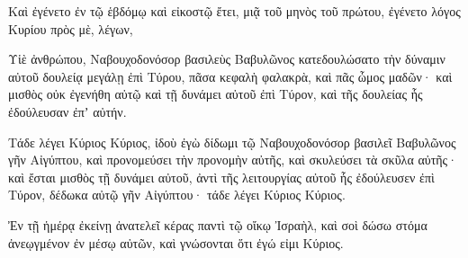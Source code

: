 {\par }{\PP {}Καὶ ἐγένετο ἐν τῷ ἑβδόμῳ καὶ εἰκοστῷ ἔτει, μιᾷ τοῦ μηνὸς τοῦ πρώτου, ἐγένετο λόγος Κυρίου πρὸς μὲ, λέγων,
\par }{\PP {}Υἱὲ ἀνθρώπου, Ναβουχοδονόσορ βασιλεὺς Βαβυλῶνος κατεδουλώσατο τὴν δύναμιν αὐτοῦ δουλείᾳ μεγάλῃ ἐπὶ Τύρου, πᾶσα κεφαλὴ φαλακρὰ, καὶ πᾶς ὦμος μαδῶν· καὶ μισθὸς οὐκ ἐγενήθη αὐτῷ καὶ τῇ δυνάμει αὐτοῦ ἐπὶ Τύρον, καὶ τῆς δουλείας ἧς ἐδούλευσαν ἐπʼ αὐτήν.
\par }{\PP {}Τάδε λέγει Κύριος Κύριος, ἰδοὺ ἐγὼ δίδωμι τῷ Ναβουχοδονόσορ βασιλεῖ Βαβυλῶνος γῆν Αἰγύπτου, καὶ προνομεύσει τὴν προνομὴν αὐτῆς, καὶ σκυλεύσει τὰ σκῦλα αὐτῆς· καὶ ἔσται μισθὸς τῇ δυνάμει αὐτοῦ,
ἀντὶ τῆς λειτουργίας αὐτοῦ ἧς ἐδούλευσεν ἐπὶ Τύρον, δέδωκα αὐτῷ γῆν Αἰγύπτου· τάδε λέγει Κύριος Κύριος.
\par }{\PP {}Ἐν τῇ ἡμέρᾳ ἐκείνῃ ἀνατελεῖ κέρας παντὶ τῷ οἴκῳ Ἰσραὴλ, καὶ σοὶ δώσω στόμα ἀνεῳγμένον ἐν μέσῳ αὐτῶν, καὶ γνώσονται ὅτι ἐγώ εἰμι Κύριος.

}
